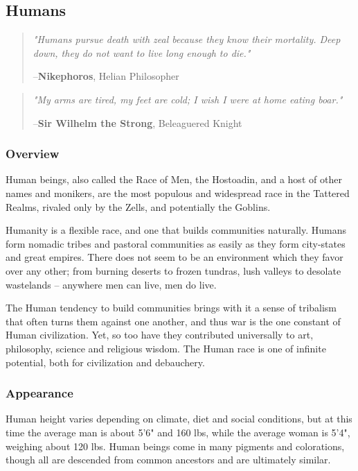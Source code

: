 \documentclass[oneside,11pt,english]{book}
\begin{document}
\subsection{Humans}\label{sec:humans}
\begin{quote}
	\emph{"Humans pursue death with zeal because they know their mortality. 
	Deep down, they do not want to live long enough to die."}\par
	\hfill--\textbf{Nikephoros}, Helian Philosopher 
\end{quote}
\begin{quote} 
	\emph{"My arms are tired, my feet are cold; 
I wish I were at home eating boar."}\par
	\hfill--\textbf{Sir Wilhelm the Strong}, Beleaguered Knight
\end{quote}
\subsubsection*{Overview}
Human beings, also called the Race of Men, the Hostoadin, and a host of other names and monikers, are the most populous and widespread race in the Tattered Realms, rivaled only by the Zells, and potentially the Goblins. 


Humanity is a flexible race, and one that builds communities naturally. Humans form nomadic tribes and 
pastoral communities as easily as they form city-states and great empires. There does not seem to be an 
environment which they favor over any other; from burning deserts to frozen tundras, lush valleys to 
desolate wastelands -- anywhere men can live, men do live.


The Human tendency to build communities brings with it a sense of tribalism that often turns them 
against one another, and thus war is the one constant of Human civilization. Yet, so too have they 
contributed universally to art, philosophy, science and religious wisdom. The Human race is one of 
infinite potential, both for civilization and debauchery. 
 

\subsubsection*{Appearance} 
Human height varies depending on climate, diet and social conditions, but at this time the average man is about 5'6" and 160 lbs, while the average woman is 5'4", weighing about 120 lbs. Human beings come in many pigments and colorations, though all are descended from common ancestors and are ultimately 
similar.
\end{document}

